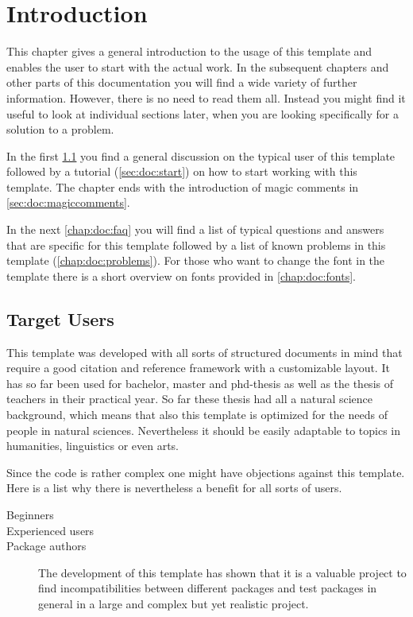 \chapter{Introduction}

This chapter gives a general introduction to the usage of this template and enables the user to start with the actual work. 
In the subsequent chapters and other parts of this documentation you will find a wide variety of further information. However, there is no need to read them all. Instead you might find it useful to look at individual sections later, when you are looking specifically for a solution to a problem.

In the first \cref{sec:doc:targetusers} you find a general discussion on the typical user of this template followed by a tutorial (\cref{sec:doc:start}) on how to start working with this template. The chapter ends with the introduction of magic comments in \cref{sec:doc:magiccomments}.

In the next \cref{chap:doc:faq} you will find a list of typical questions and answers that are specific for this template followed by a list of known problems in this template (\cref{chap:doc:problems}). For those who want to change the font in the template there is a short overview on fonts provided in \cref{chap:doc:fonts}.

\section{Target Users}
\label{sec:doc:targetusers}

This template was developed with all sorts of structured documents in mind that require a good citation and reference framework with a customizable layout. It has so far been used for bachelor, master and phd-thesis as well
as the thesis of teachers in their practical year. So far these thesis had all a natural science background, which means that also this template is optimized for the needs of people in natural sciences. Nevertheless it should be easily adaptable to topics in humanities, linguistics or even arts.

Since the code is rather complex one might have objections against this template. Here is a list why there is nevertheless a benefit for all sorts of users.

\begin{description}
\item[Beginners]
\item[Experienced \latex users]
\item[Package authors] The development of this template has shown that it is a valuable project to find incompatibilities between different packages and test packages in general in a large and complex but yet realistic project.
\end{description}


